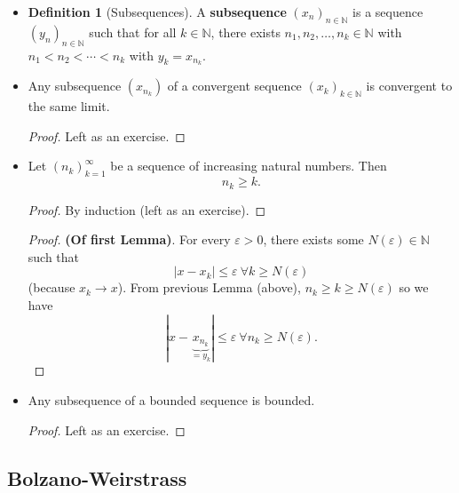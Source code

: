 \documentclass{article}
\newcommand{\N}{\mathbb{N}}
\newcommand{\seq}[2]{(#1_{#2})_{#2 \in \N}}
\newcommand{\?}{\stackrel{?}{=}}
\theoremstyle{definition} %
\newtheorem{definition}[subsection]{Definition} %
\begin{document}
\begin{itemize}
    \item[]
          \begin{definition}[Subsequences]
              A \textbf{subsequence} $\seq{x}{n}$ is a sequence $\seq{y}{n}$ such that for all $k \in \N$, there exists $n_1, n_2, \ldots, n_k \in \N$ with $n_1 < n_2 < \cdots < n_k$ with $y_k = x_{n_k}$.
          \end{definition}
    \item[]
          \begin{lemma}
              Any subsequence $(x_{n_k})$ of a convergent sequence $\seq{x}{k}$ is convergent to the same limit.
          \end{lemma}
          \begin{proof}
              Left as an exercise.
          \end{proof}
    \item[]
          \begin{lemma}
              Let $(n_k)_{k = 1}^{\infty}$ be a sequence of increasing natural numbers. Then
              $$n_k \geq k.$$
          \end{lemma}
          \begin{proof}
              By induction (left as an exercise).
          \end{proof}
          \begin{proof}
              \textbf{(Of first Lemma)}. For every $\varepsilon > 0$, there exists some $N(\varepsilon) \in \N$ such that
              $$|x - x_k| \leq \varepsilon \ \forall k \geq N(\varepsilon)$$
              (because $x_k \rightarrow x$). From previous Lemma (above), $n_k \geq k \geq N(\varepsilon)$ so we have
              $$|x - \underbrace{x_{n_k}}_{ = y_k}| \leq \varepsilon \ \forall n_k \geq N(\varepsilon).$$
          \end{proof}
    \item[]
          \begin{lemma}
              Any subsequence of a bounded sequence is bounded.
          \end{lemma}
          \begin{proof}
              Left as an exercise.
          \end{proof}
\end{itemize}

\subsection{Bolzano-Weirstrass}
\end{document}
